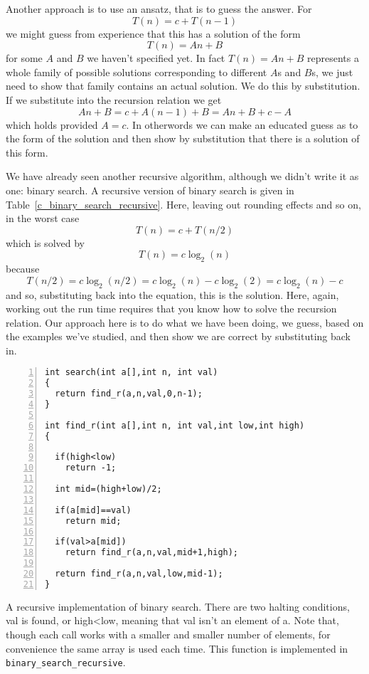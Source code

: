 \documentclass[11pt,a4paper]{scrartcl}
\begin{document}
Another approach is to use an ansatz, that is to guess the answer. For
\begin{equation}
T(n)=c+T(n-1)
\end{equation}
we might guess from experience that this has a solution of the form
\begin{equation}
T(n)=An+B
\end{equation}
for some $A$ and $B$ we haven't specified yet. In fact $T(n)=An+B$
represents a whole family of possible solutions corresponding to different $A$s
and $B$s, we just need to show that family contains an actual solution. We do this by substitution. If we substitute into the recursion relation we get
\begin{equation}
An+B=c+A(n-1)+B=An+B+c-A
\end{equation}
which holds provided $A=c$. In otherwords we can make an educated
guess as to the form of the solution and then show by substitution
that there is a solution of this form.

We have already seen another recursive algorithm, although we didn't
write it as one: binary search. A recursive version of binary search is
given in Table~\ref{c_binary_search_recursive}. Here, leaving out
rounding effects and so on, in the worst case
\begin{equation}
T(n)=c+T(n/2)
\end{equation}
which is solved by 
\begin{equation}
T(n)=c\log_2(n)
\end{equation}
because 
\begin{equation}
T(n/2)=c\log_2(n/2)=c\log_2(n)-c\log_2(2)=c\log_2(n)-c
\end{equation}
and so, substituting back into the equation, this is the solution.
Here, again, working out the run time requires that you know how to
solve the recursion relation. Our approach here is to do what we have
been doing, we guess, based on the examples we've studied, and then
show we are correct by substituting back in.

\begin{table}
\begin{lstlisting}[numbers=left]
int search(int a[],int n, int val)
{
  return find_r(a,n,val,0,n-1);
}
 
int find_r(int a[],int n, int val,int low,int high)
{

  if(high<low)
    return -1;

  int mid=(high+low)/2;

  if(a[mid]==val)
    return mid;

  if(val>a[mid])
    return find_r(a,n,val,mid+1,high);
  
  return find_r(a,n,val,low,mid-1);
}
\end{lstlisting}
\caption{A recursive implementation of binary search. There are two
  halting conditions, val is found, or high<low, meaning that val
  isn't an element of a. Note that, though each call works with a
  smaller and smaller number of elements, for convenience the same
  array is used each time. This function is implemented in \texttt{
    binary\_search\_recursive}.\label{c_binary_search_recursive}}
\end{table}
\end{document}
